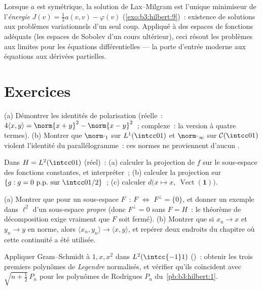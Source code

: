 \begin{remark}\label{rem:b3:hilbert:variational}
Lorsque $a$ est symétrique, la solution de Lax--Milgram est
l'unique minimiseur de l'\emph{énergie} $J(v) =
\frac12a(v,v) - \varphi(v)$ (\cref{exo:b3:hilbert:9})~:
existence de solutions aux problèmes variationnels d'un seul
coup. Appliqué à des espaces de fonctions adéquats (les
espaces de Sobolev d'un cours ultérieur), ceci résout les
problèmes aux limites pour les équations différentielles ---
la porte d'entrée moderne aux équations aux dérivées
partielles.
\end{remark}

\section{Exercices}

\begin{exercise}[$\star$]\label{exo:b3:hilbert:1}
(a) Démontrer les identités de polarisation (réelle~:
$4\langle x, y\rangle = \norm{x+y}^2 - \norm{x-y}^2$~;
complexe~: la version à quatre termes).
(b) Montrer que $\norm\cdot_1$ sur $L^1(\intcc01)$ et
$\norm\cdot_\infty$ sur $\mathcal C(\intcc01)$ violent
l'identité du parallélogramme~: ces normes ne proviennent
d'aucun .
\end{exercise}

\begin{exercise}[$\star$]\label{exo:b3:hilbert:2}
Dans $H = L^2(\intcc01)$ (réel)~:
(a) calculer la projection de $f$ sur le sous-espace des
fonctions constantes, et interpréter~;
(b) calculer la projection sur $\{g : g = 0 \text{ p.p.\ sur }
\intcc0{1/2}\}$~;
(c) calculer $d\bigl(x \mapsto x,\ \operatorname{Vect}(\mathbf
1)\bigr)$.
\end{exercise}

\begin{exercise}[$\star\star$]\label{exo:b3:hilbert:3}
(a) Montrer que pour un sous-espace $F$~: $F$  $\iff$
$F^\perp = \{0\}$, et donner un exemple dans $\ell^2$ d'un
sous-espace  \emph{propre} (donc $F^\perp = 0$ sans $F
= H$~: le théorème de décomposition exige vraiment que $F$
soit fermé).
(b) Montrer que si $x_n \to x$ et $y_n \to y$ en norme, alors
$\langle x_n, y_n\rangle \to \langle x, y\rangle$, et repérer
deux endroits du chapitre où cette continuité a été utilisée.
\end{exercise}

\begin{exercise}[$\star\star$]\label{exo:b3:hilbert:4}
Appliquer Gram--Schmidt à $1, x, x^2$ dans $L^2(\intcc{-1}1)$
()~: obtenir les trois premiers polynômes de
\emph{Legendre} normalisés, et vérifier qu'ils coïncident
avec $\sqrt{n + \frac12}\,P_n$ pour les polynômes de Rodrigues
$P_n$ du~\cref{pb:b3:hilbert:1}.
\end{exercise}

